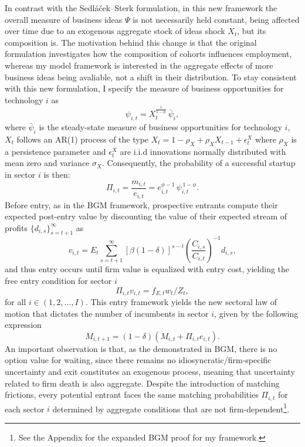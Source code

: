 \documentclass[a4paper,12pt]{article} %
\numberwithin{equation}{section} %
\numberwithin{figure}{section}
\numberwithin{table}{section}
\begin{document}
In contrast with the Sedláček–Sterk formulation, in this new framework the overall measure of business ideas \(\Psi\) is not necessarily held constant,
being affected over time due to an exogenous aggregate stock of ideas shock \(X_t\), but its composition is. The motivation behind this change is that
the original formulation investigates how the composition of cohorts influences employment, whereas my model framework is interested in the aggregate 
effects of more business ideas being avaliable, not a shift in their distribution. To stay consistent with this new formulation, I specify the measure 
of business opportunities for technology \(i\) as 
\begin{equation}
  \psi_{i,t} =X_t^{\frac{1}{1-\phi}}\,\bar{\psi}_i, \label{eq:psilaw}
\end{equation}
where \(\bar{\psi}_i\) is the steady-state measure of business opportunities for technology \(i\), $X_t$ follows an AR(1) process of the type 
$X_t = 1 - \rho_X + \rho_X X_{t-1} + \epsilon^X_t$ where $\rho_X$ is a persistence parameter and $\epsilon^X_t$ are i.i.d innovations 
normally distributed with mean zero and variance $\sigma_X$. Consequently, the probability of a successful startup in sector $i$ is then:
\begin{equation}
  \Pi_{i,t} = \frac{m_{i,t}}{e_{i,t}} = e_{i,t}^{\phi-1}\,\psi_{i,t}^{\,1-\phi}. \label{eq:probability}
\end{equation}
Before entry, as in the BGM framework, prospective entrants compute their expected post-entry value by discounting the value of their expected stream
of profits $\{d_{i,s}\}_{s=t+1}^\infty$ as
\begin{equation}
  v_{i,t} = E_t \sum_{s = t+1}^{\infty} \left[ \beta (1 - \delta) \right]^{s - t} \left( \frac{C_{i,s}}{C_{i,t}} \right)^{-1} d_{i,s}, \label{eq:value}
\end{equation}
and thus entry occurs until firm value is equalized with entry cost, yielding the free entry condition for sector $i$ 
\begin{equation}
  \Pi_{i,t}v_{i,t} = f_{E,t}w_t/Z_t , \label{eq:freeentry}
\end{equation}
for all $i \in (1,2,..., I)$. This entry framework yields the new sectoral law of motion that dictates the number of incumbents in sector $i$, 
given by the following expression
\begin{equation}
  M_{i,t+1} = (1-\delta)(M_{i,t} + \Pi_{i,t}e_{i,t}). \label{eq:entrants}
\end{equation}
An important observation is that, as the demonstrated in BGM, there is no option value for waiting, since there remains no 
idiosyncratic/firm-specific uncertainty and exit constitutes an exogenous process, meaning that uncertainty related to firm death is also aggregate. 
Despite the introduction of matching frictions, every potential entrant faces the same matching probabilities $\Pi_{i,t}$ for each sector $i$ 
determined by aggregate conditions that are not firm-dependent\footnote{See the Appendix for the expanded BGM proof for my framework.}.
\end{document}
